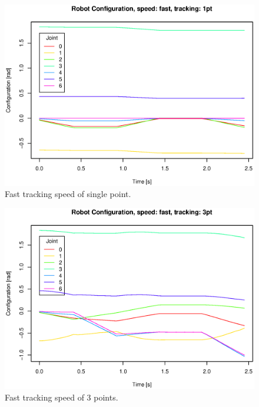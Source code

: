\begin{figure}[H]
\centering
\includegraphics[width= \fullImageWidth]{graphics/robotics/robotConfiguration_fast_1pt}
\caption{Fast tracking speed of single point.}
\label{fig:robotic_conf_fast_1pt}
\end{figure}

\begin{figure}[H]
\centering
\includegraphics[width= \fullImageWidth]{graphics/robotics/robotConfiguration_fast_3pt}
\caption{Fast tracking speed of 3 points.}
\label{fig:robotic_conf_fast_3pt}
\end{figure}


